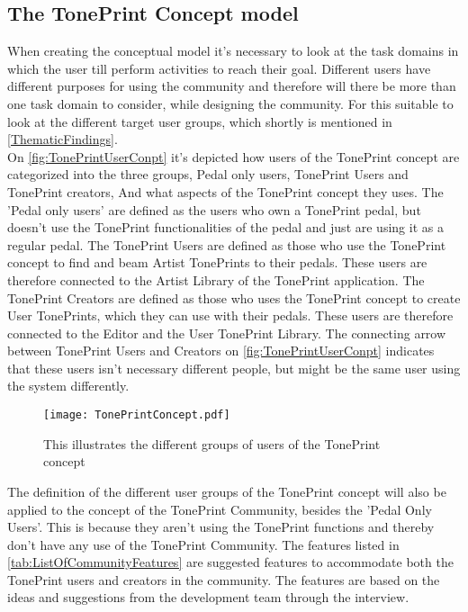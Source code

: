 \subsection{The TonePrint Concept model}
\label{TonePrintConceptualModel}
When creating the conceptual model it's necessary to look at the task domains in which the user till perform activities to reach their goal. Different users have different purposes for using the community and therefore will there be more than one task domain to consider, while designing the community. For this suitable to look at the different target user groups, which shortly is mentioned in \autoref{ThematicFindings}.\\
On \autoref{fig:TonePrintUserConpt} it's depicted how users of the TonePrint concept are categorized into the three groups, Pedal only users, TonePrint Users and TonePrint creators, And what aspects of the TonePrint concept they uses. The 'Pedal only users' are defined as the users who own a TonePrint pedal, but doesn't use the TonePrint functionalities of the pedal and just are using it as a regular pedal. The TonePrint Users are defined as those who use the TonePrint concept to find and beam Artist TonePrints to their pedals. These users are therefore connected to the Artist Library of the TonePrint application. The TonePrint Creators are defined as those who uses the TonePrint concept to create User TonePrints, which they can use with their pedals. These users are therefore connected to the Editor and the User TonePrint Library. The connecting arrow between TonePrint Users and Creators on \autoref{fig:TonePrintUserConpt} indicates that these users isn't necessary different people, but might be the same user using the system differently. 

\begin{figure}[H]
	\centering
	\texttt{[image: TonePrintConcept.pdf]}
	\caption{This illustrates the different groups of users of the TonePrint concept}
	\label{fig:TonePrintUserConpt}
\end{figure}

The definition of the different user groups of the TonePrint concept will also be applied to the concept of the TonePrint Community, besides the 'Pedal Only Users'. This is because they aren't using the TonePrint functions and thereby don't have any use of the TonePrint Community. The features listed in \autoref{tab:ListOfCommunityFeatures} are suggested features to accommodate both the TonePrint users and creators in the community. The features are based on the ideas and suggestions from the development team through the interview.

